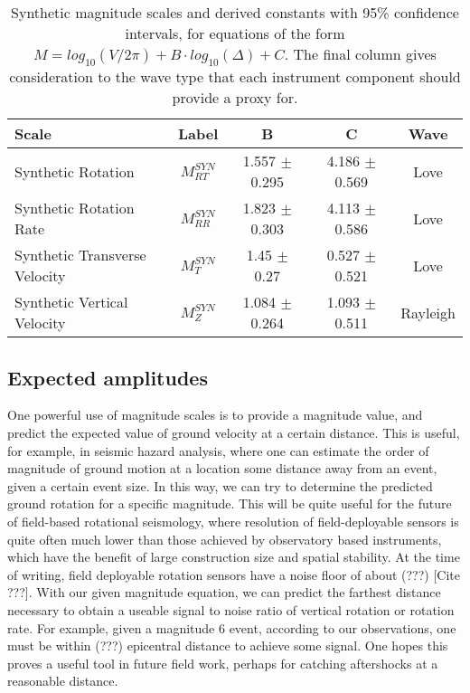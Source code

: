\documentclass{gji}
\begin{document}
\begin{table*}
\begin{minipage}{115mm}
	\begin{center}
		\begin{tabular}{ |l|c|c|c|c| } 
		        \bf{Scale} & \bf{Label} & \bf{B} & \bf{C}  & \bf{Wave}\\ \hline
        Synthetic Rotation  & $M^{SYN}_{RT}$ & 1.557 $\pm$ 0.295 & 4.186 $\pm$ 0.569  & Love \\ \hline
	Synthetic Rotation Rate & $M^{SYN}_{RR}$ & 1.823 $\pm$ 0.303 & 4.113 $\pm$ 0.586  & Love\\ \hline 
        Synthetic Transverse Velocity & $M^{SYN}_T$ & 1.45 $\pm$ 0.27 & 0.527 $\pm$ 0.521 & Love \\ \hline
        Synthetic Vertical Velocity  & $M^{SYN}_Z$ & 1.084 $\pm$ 0.264 & 1.093 $\pm$ 0.511  & Rayleigh \\ \hline
		\end{tabular}
		
    		\caption{Synthetic magnitude scales and derived constants with 95\% confidence intervals, for equations of the form $M = log_{10}(V/2\pi) + B\cdot log_{10}(\Delta) + C$. The final column gives consideration to the wave type that each instrument component should provide a proxy for.}
		\label{tab:syn_scales}
	\end{center}
	\end{minipage}
\end{table*}

\subsection{Expected amplitudes}
One powerful use of magnitude scales is to provide a magnitude value, and predict the expected value of ground velocity at a certain distance. This is useful, for example, in seismic hazard analysis, where one can estimate the order of magnitude of ground motion at a location some distance away from an event, given a certain event size. In this way, we can try to determine the predicted ground rotation for a specific magnitude. This will be quite useful for the future of field-based rotational seismology, where resolution of field-deployable sensors is quite often much lower than those achieved by observatory based instruments, which have the benefit of large construction size and spatial stability. At the time of writing, field deployable rotation sensors have a noise floor of about (???) [Cite ???]. With our given magnitude equation, we can predict the farthest distance necessary to obtain a useable signal to noise ratio of vertical rotation or rotation rate. For example, given a magnitude 6 event, according to our observations, one must be within (???) epicentral distance to achieve some signal. One hopes this proves a useful tool in future field work, perhaps for catching aftershocks at a reasonable distance.
\end{document}
